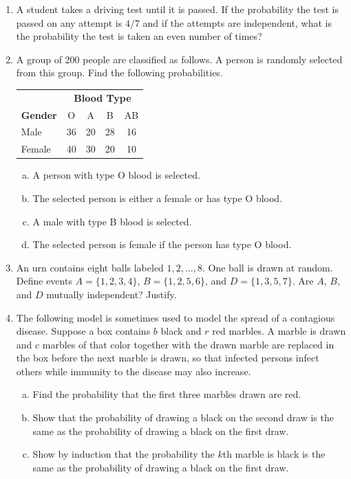 \documentclass[12pt]{article}
\begin{document}
\begin{enumerate}
  \item A student takes a driving test until it is passed. If the probability the test is passed on any attempt is $4/7$ and if the attempts are independent, what is the probability the test is taken an even number of times?

\newpage

  \item A group of 200 people are classified as follows. A person is randomly selected from this group. Find the following probabilities.

    \begin{center}
    \begin{tabular}{l|cccc}
               & \multicolumn{4}{c}{\textbf{Blood Type}} \\
      \textbf{Gender} & O & A & B & AB \\ \hline
      Male     & 36 & 20 & 28 & 16 \\
      Female   & 40 & 30 & 20 & 10 \\
    \end{tabular}
    \end{center}

    \begin{enumerate}[(a)]
      \item A person with type O blood is selected.
      \item The selected person is either a female or has type O blood.
      \item A male with type B blood is selected.
      \item The selected person is female if the person has type O blood.
    \end{enumerate}

  \item An urn contains eight balls labeled $1, 2, \dots, 8$. One ball is drawn at random. Define events $A = \{1,2,3,4\}$, $B = \{1,2,5,6\}$, and $D = \{1,3,5,7\}$. Are $A$, $B$, and $D$ mutually independent? Justify.

\newpage

  \item The following model is sometimes used to model the spread of a contagious disease. Suppose a box contains $b$ black and $r$ red marbles. A marble is drawn and $c$ marbles of that color together with the drawn marble are replaced in the box before the next marble is drawn, so that infected persons infect others while immunity to the disease may also increase.
    \begin{enumerate}[(a)]
      \item Find the probability that the first three marbles drawn are red.
      \item Show that the probability of drawing a black on the second draw is the same as the probability of drawing a black on the first draw.
      \item Show by induction that the probability the $k$th marble is black is the same as the probability of drawing a black on the first draw.
    \end{enumerate}


\end{enumerate}
\end{document}
